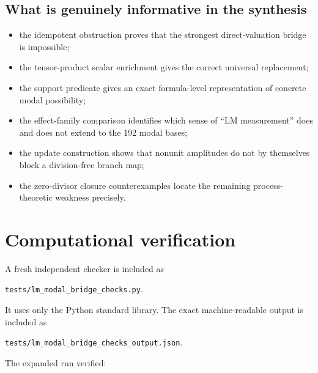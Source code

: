 \documentclass[11pt]{article}
\theoremstyle{definition}
\begin{document}
\subsection{What is genuinely informative in the synthesis}
\begin{itemize}
\item the idempotent obstruction proves that the strongest direct-valuation bridge is impossible;
\item the tensor-product scalar enrichment gives the correct universal replacement;
\item the support predicate gives an exact formula-level representation of concrete modal possibility;
\item the effect-family comparison identifies which sense of ``LM measurement'' does and does not extend to the 192 modal bases;
\item the update construction shows that nonunit amplitudes do not by themselves block a division-free branch map;
\item the zero-divisor closure counterexamples locate the remaining process-theoretic weakness precisely.
\end{itemize}

\section{Computational verification}

A fresh independent checker is included as
\begin{center}
\texttt{tests/lm\_modal\_bridge\_checks.py}.
\end{center}
It uses only the Python standard library. The exact machine-readable output is included as
\begin{center}
\texttt{tests/lm\_modal\_bridge\_checks\_output.json}.
\end{center}

The expanded run verified:
\end{document}
